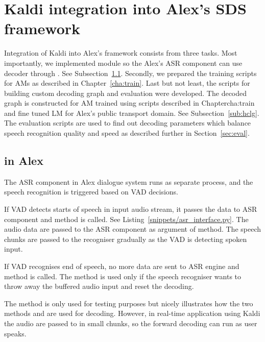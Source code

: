 \section[Kaldi integration into \ac{SDS} framework]{Kaldi integration into Alex's \acl{SDS} framework}
\label{sec:asrsds}

Integration of Kaldi into Alex's framework consists from three tasks.
Most importantly, we implemented  module so the Alex's \ac{ASR} component can use  decoder through .
See Subsection~\ref{sub:asr_component}.
Secondly, we prepared the training scripts for \acp{AM} as described in Chapter~\ref{cha:train}.
Last but not least, the scripts for building custom decoding graph  and evaluation were developed.
The decoded graph  is constructed for \ac{AM} trained using scripts described in Chapter{cha:train} and fine tuned \ac{LM} for Alex's public transport domain.
See Subsection~\ref{sub:hclg}.
The evaluation scripts are used to find out decoding parameters which balance speech recognition quality and speed as described further in Section~\ref{sec:eval}.

\subsection{ in Alex}
\label{sub:asr_component}
The \ac{ASR} component in Alex dialogue system runs as separate process, and the speech recognition is triggered based on \ac{VAD} decisions.

If \ac{VAD} detects starts of speech in input audio stream, it passes the data to \ac{ASR} component
and  method is called. See Listing~\ref{snippets/asr_interface.py}.
The audio data are passed to the ASR component as argument of  method.
The speech chunks are passed to the recogniser gradually as the \ac{VAD} is detecting spoken input.

If \ac{VAD} recognises end of speech, no more data are sent to \ac{ASR} engine and  method is called.
The  method is used only if the speech recogniser wants to throw away the buffered audio input and reset the decoding.


The method  is only used for testing purposes but nicely illustrates how the two methods  and  are used for decoding. However, in real-time application using Kaldi the audio are passed to  in small chunks, so the forward decoding can run as user speaks. 

